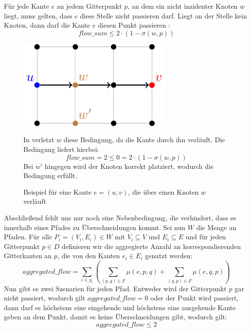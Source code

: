 \documentclass[bachelor, german]{algothesis}
\begin{document}
Für jede Kante $e$ an jedem Gitterpunkt $p$, an dem ein nicht inzidenter Knoten $w$ liegt, muss gelten, dass $e$ diese Stelle nicht passieren darf. Liegt an der Stelle kein Knoten, dann darf die Kante $e$ diesen Punkt passieren :
\begin{equation}
flow\_sum \leq 2 \cdot (1 - \sigma(w,p))
\tag{4}
\end{equation}
\begin{figure}[H]
    \begin{minipage}{0.45\textwidth}
    \centering
    \includegraphics{figures/OverNodePoint.png}
    \caption{Beispiel für eine Kante $e=(u,v)$, die über einen Knoten $w$ verläuft}
    \label{fig:OverNodePoint}
    \end{minipage}
    \begin{minipage}{0.5\textwidth}
    \small
    In  verletzt $w$ diese Bedingung, da die Kante durch ihn verläuft. 
    Die Bedingung liefert hierbei:$$flow\_sum=2 \leq 0 = 2 \cdot (1-\sigma(w,p))$$ Bei $w'$ hingegen wird der Knoten korrekt platziert, wodurch die Bedingung erfüllt.
    \end{minipage}
\end{figure}
Abschließend fehlt uns nur noch eine Nebenbedingung, die verhindert, dass es innerhalb eines Pfades zu Überschneidungen kommt. Sei nun $W$ die Menge an Pfaden. Für alle $P_i =(V_i, E_i) \in W$  mit $V_i\subseteq V$ und  $E_i \subseteq E$ und für jeden Gitterpunkt $p \in D$ definieren wir die aggregierte Anzahl an korrespondierenden Gitterkanten an $p$, die von den Kanten $e_i \in E_i$ genutzt werden: $$aggregated\_flow = \sum_{e \in p_i}(\sum_{(p,q) \in F} \mu(e,p,q) + \sum_{(q,p) \in F} \mu(e,q,p))$$  Nun gibt es zwei Szenarien für jeden Pfad. Entweder wird der Gitterpunkt $p$ gar nicht passiert, wodurch gilt $aggregated\_flow = 0$ oder der Punkt wird passiert, dann darf es höchstens eine eingehende und höchstens eine ausgehende Kante geben an dem Punkt, damit es keine Überschneidungen gibt, wodurch gilt:
\begin{equation}
    aggregated\_flow \leq 2
    \tag{5}
\end{equation} 
\end{document}
